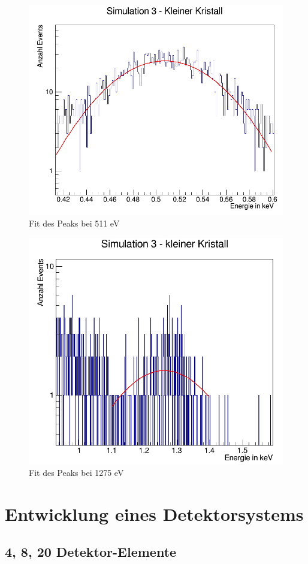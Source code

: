 \documentclass[a4paper,14pt,twoside]{article}
\begin{document}
			\begin{figure}[H]
				\begin{center}
				\includegraphics[width=0.7\linewidth]{Simulation3(KB)_511_fit}
				\caption{Fit des Peaks bei 511 eV}
				\label{S3_511_fit}
				\end{center}
			\end{figure}
			
			\begin{figure}[H]
				\begin{center}
				\includegraphics[width=0.7\linewidth]{Simulation3(KB)_1275_fit}
				\caption{Fit des Peaks bei 1275 eV}
				\label{S3_1275_fit}
				\end{center}
			\end{figure}
			
\section{Entwicklung eines Detektorsystems}
	\subsection{4, 8, 20 Detektor-Elemente}			
\end{document}

